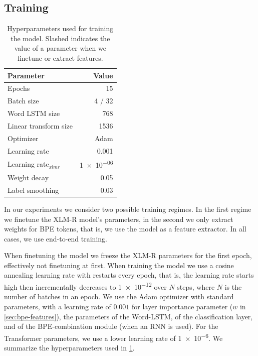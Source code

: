 \documentclass[11pt]{article}
\newcommand\citep{\cite}
\begin{document}
    \subsection{Training}

            \begin{table}
		\centering
		\begin{tabular}{lr} \\
			Parameter & Value \\
			\hline
			Epochs & 15 \\
			Batch size & 4 / 32 \\
            Word LSTM size & 768 \\
            Linear transform size & 1536 \\
			Optimizer & Adam \\
			Learning rate & 0.001 \\
			Learning rate$_{xlmr}$ & \num{1e-06} \\
            Weight decay & 0.05 \\
			Label smoothing & 0.03 \\
		\end{tabular}
    		\caption{\label{tab:parameters} Hyperparameters used for
     training the model. Slashed indicates the value of a parameter
     when we finetune or extract features.}
	\end{table}
    
     In our experiments we consider two possible training regimes. In
     the first regime we finetune the XLM-R model's parameters, in the
     second we only extract weights for BPE tokens, that is, we
     use the model as a feature extractor. In all cases, we use
     end-to-end training.
     
                             When finetuning the model we freeze the
     XLM-R parameters for the first epoch, effectively not finetuning
     at first. When training the model we use a cosine annealing
     learning rate \citep{loshchilov2016sgdr} with restarts every
     epoch, that is, the learning rate starts high then incrementally
     decreases to \num{1e-12} over $N$ steps, where $N$ is the
     number of batches in an epoch.  We use the Adam optimizer with
     standard parameters, with a learning rate of $0.001$ for layer
     importance parameter ($w$ in \cref{sec:bpe-features}), the
     parameters of the Word-LSTM, of the classification layer, and of
     the BPE-combination module (when an RNN is used).  For the
     Transformer parameters, we use a lower learning rate of
     \num{1e-6}.  We summarize the hyperparameters used in
     \cref{tab:parameters}.
\end{document}
